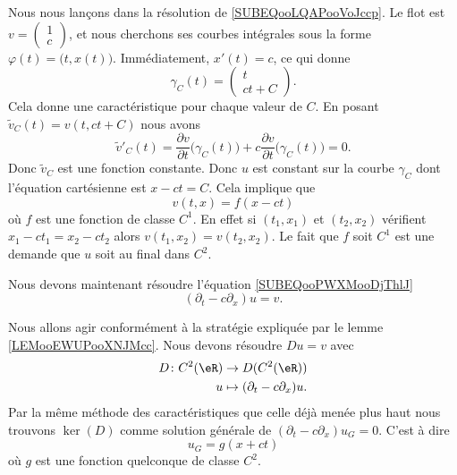 Nous nous lançons dans la résolution de \eqref{SUBEQooLQAPooVoJccp}. Le flot est \( v=\begin{pmatrix}
    1    \\ 
    c    
\end{pmatrix}\), et nous cherchons ses courbes intégrales sous la forme \( \varphi(t)=\big( t,x(t) \big)\). Immédiatement, \( x'(t)=c\), ce qui donne
\begin{equation}
    \gamma_C(t)=\begin{pmatrix}
        t    \\ 
        ct+C    
    \end{pmatrix}.
\end{equation}
Cela donne une caractéristique pour chaque valeur de \( C\). En posant \( \tilde v_C(t)=v(t,ct+C)\) nous avons
\begin{equation}
    \tilde v'_C(t)=\frac{ \partial v }{ \partial t }\big( \gamma_C(t) \big)+c\frac{ \partial v }{ \partial t }\big( \gamma_C(t) \big)=0.
\end{equation}
Donc \( \tilde v_C\) est une fonction constante. Donc \( u\) est constant sur la courbe \( \gamma_C\) dont l'équation cartésienne est \( x-ct=C\). Cela implique que
\begin{equation}
    v(t,x)=f(x-ct)
\end{equation}
où \( f\) est une fonction de classe \( C^1\). En effet si \( (t_1,x_1)\) et \( (t_2,x_2)\) vérifient \( x_1-ct_1=x_2-ct_2\) alors \( v(t_1,x_2)=v(t_2,x_2)\). Le fait que \( f\) soit \( C^1\) est une demande que \( u\) soit au final dans \( C^2\).

Nous devons maintenant résoudre l'équation \eqref{SUBEQooPWXMooDjThlJ}
\begin{equation}
    (\partial_t-c\partial_x)u=v.
\end{equation}

Nous allons agir conformément à la stratégie expliquée par le lemme \ref{LEMooEWUPooXNJMcc}. Nous devons résoudre \( Du=v\) avec
\begin{equation}
    \begin{aligned}
        D\colon C^2(\eR)&\to D(C^2(\eR)) \\
        u&\mapsto (\partial_t-c\partial_x)u. 
    \end{aligned}
\end{equation}
Par la même méthode des caractéristiques que celle déjà menée plus haut nous trouvons \( \ker(D)\) comme solution générale de \( (\partial_t-c\partial_x)u_G=0\). C'est à dire
\begin{equation}
    u_G=g(x+ct)
\end{equation}
où \( g\) est une fonction quelconque de classe \( C^2\).

